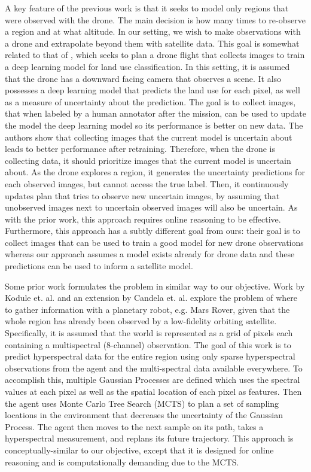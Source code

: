 A key feature of the previous work is that it seeks to model only regions that were observed with the drone. The main decision is how many times to re-observe a region and at what altitude. In our setting, we wish to make observations with a drone and extrapolate beyond them with satellite data. This goal is somewhat related to that of \cite{Ruckin2022}, which seeks to plan a drone flight that collects images to train a deep learning model for land use classification. In this setting, it is assumed that the drone has a downward facing camera that observes a scene. It also possesses a deep learning model that predicts the land use for each pixel, as well as a measure of uncertainty about the prediction. The goal is to collect images, that when labeled by a human annotator after the mission, can be used to update the model the deep learning model so its performance is better on new data. The authors show that collecting images that the current model is uncertain about leads to better performance after retraining. Therefore, when the drone is collecting data, it should prioritize images that the current model is uncertain about. As the drone explores a region, it generates the uncertainty predictions for each observed images, but cannot access the true label. Then, it continuously updates plan that tries to observe new uncertain images, by assuming that unobserved images next to uncertain observed images will also be uncertain. As with the prior work, this approach requires online reasoning to be effective. Furthermore, this approach has a subtly different goal from ours: their goal is to collect images that can be used to train a good model for new drone observations whereas our approach assumes a model exists already for drone data and these predictions can be used to inform a satellite model. 

Some prior work formulates the problem in similar way to our objective. Work by Kodule et. al. \cite{Kodgule2019Non-myopicMeasurements} and an extension by Candela et. al. \cite{Candela2020PlanetaryMapping} explore the problem of where to gather information with a planetary robot, e.g. Mars Rover, given that the whole region has already been observed by a low-fidelity orbiting satellite. Specifically, it is assumed that the world is represented as a grid of pixels each containing a multispectral (8-channel) observation. The goal of this work is to predict hyperspectral data for the entire region using only sparse hyperspectral observations from the agent and the multi-spectral data available everywhere. To accomplish this, multiple Gaussian Processes \cite{Rasmussen2004} are defined which uses the spectral values at each pixel as well as the spatial location of each pixel as features. Then the agent uses Monte Carlo Tree Search (MCTS) \cite{Browne2012AMethods} to plan a set of sampling locations in the environment that decreases the uncertainty of the Gaussian Process. The agent then moves to the next sample on its path, takes a hyperspectral measurement, and replans its future trajectory. This approach is conceptually-similar to our objective, except that it is designed for online reasoning and is computationally demanding due to the MCTS.

